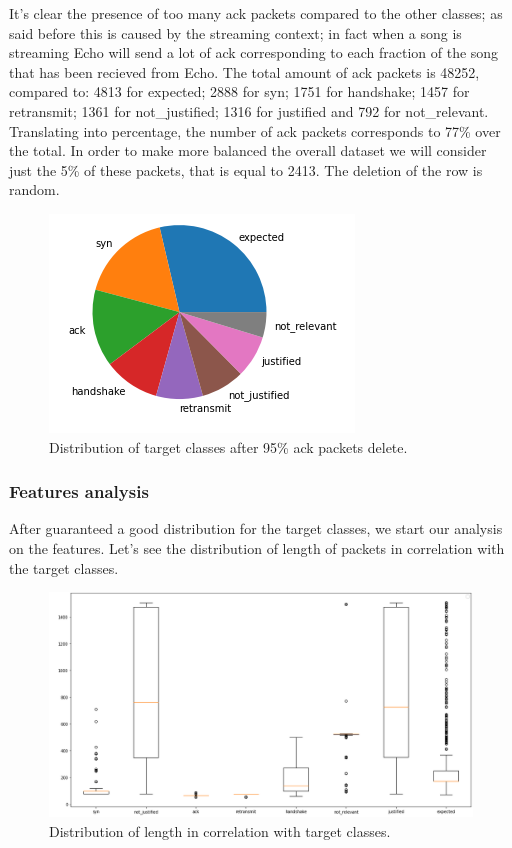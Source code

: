 \documentclass[sigconf]{acmart}
\begin{document}
    It's clear the presence of too many ack packets compared to the other classes; as said before this is caused by the streaming context; in fact when a song is streaming Echo will send a lot of ack corresponding to each fraction of the song that has been recieved from Echo. The total amount of ack packets is 48252, compared to: 4813 for expected; 2888 for syn; 1751 for handshake; 1457 for retransmit; 1361 for not\_justified; 1316 for justified and 792 for not\_relevant. Translating into percentage, the number of ack packets corresponds to 77\% over the total. In order to make more balanced the overall dataset we will consider just the 5\% of these packets, that is equal to 2413. The deletion of the row is random.
    \begin{figure}[h!]
        \includegraphics[width=0.8\linewidth]{img/target_class_distribution_after_del.png}
        \caption{Distribution of target classes after 95\% ack packets delete.}
        \label{fig:target_class_distribution_after_del}
    \end{figure}

    \subsubsection{Features analysis}
    After guaranteed a good distribution for the target classes, we start our analysis on the features. Let's see the distribution of length of packets in correlation with the target classes.
    \begin{figure}[h!]
        \includegraphics[width=0.8\linewidth]{img/length_distribution.png}
        \caption{Distribution of length in correlation with target classes.}
        \label{fig:length_distribution}
    \end{figure}
\end{document}
